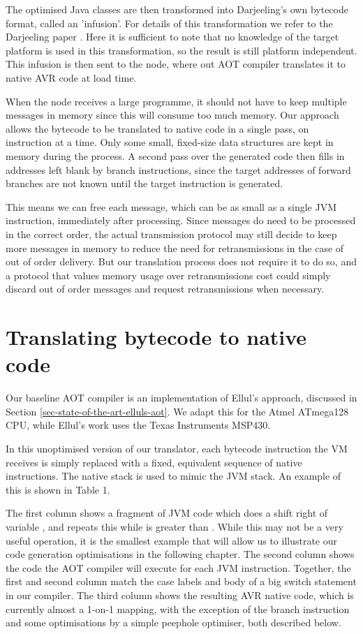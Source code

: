 The optimised Java classes are then transformed into Darjeeling's own bytecode format, called an 'infusion'. For details of this transformation we refer to the Darjeeling paper \cite{Brouwers:2009cj}. Here it is sufficient to note that no knowledge of the target platform is used in this transformation, so the result is still platform independent. This infusion is then sent to the node, where out AOT compiler translates it to native AVR code at load time.

When the node receives a large programme, it should not have to keep multiple messages in memory since this will consume too much memory. Our approach allows the bytecode to be translated to native code in a single pass, on instruction at a time. Only some small, fixed-size data structures are kept in memory during the process. A second pass over the generated code then fills in addresses left blank by branch instructions, since the target addresses of forward branches are not known until the target instruction is generated.

This means we can free each message, which can be as small as a single JVM instruction, immediately after processing. Since messages do need to be processed in the correct order, the actual transmission protocol may still decide to keep more messages in memory to reduce the need for retransmissions in the case of out of order delivery. But our translation process does not require it to do so, and a protocol that values memory usage over retransmissions cost could simply discard out of order messages and request retransmissions when necessary.


\section{Translating bytecode to native code}
\label{sec-basic-translation}
Our baseline AOT compiler is an implementation of Ellul's approach, discussed in Section \ref{sec-state-of-the-art-elluls-aot}. We adapt this for the Atmel ATmega128 CPU, while Ellul's work uses the Texas Instruments MSP430. 

In this unoptimised version of our translator, each bytecode instruction the VM receives is simply replaced with a fixed, equivalent sequence of native instructions. The native stack is used to mimic the JVM stack. An example of this is shown in Table 1.

The first column shows a fragment of JVM code which does a shift right of variable , and repeats this while  is greater than . While this may not be a very useful operation, it is the smallest example that will allow us to illustrate our code generation optimisations in the following chapter. The second column shows the code the AOT compiler will execute for each JVM instruction. Together, the first and second column match the case labels and body of a big switch statement in our compiler. The third column shows the resulting AVR native code, which is currently almost a 1-on-1 mapping, with the exception of the branch instruction and some optimisations by a simple peephole optimiser, both described below.

